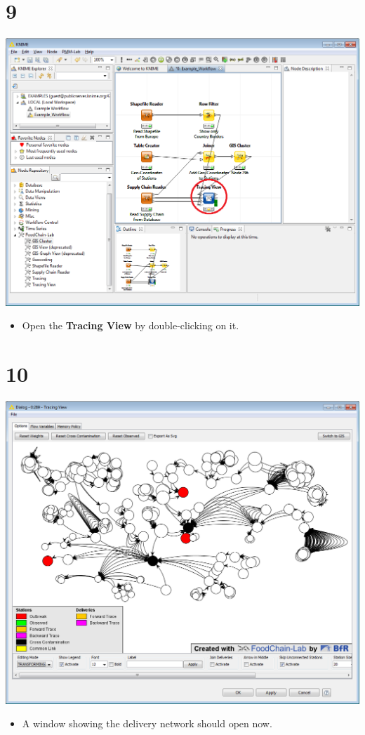 \documentclass{beamer}
\begin{document}
\section{9}
\begin{frame}
	\begin{center}
  		\includegraphics[height=0.6\textheight]{9.png}
	\end{center}
	\begin{itemize}
		\item Open the \textbf{Tracing View} by double-clicking on it.
	\end{itemize}
\end{frame}

\section{10}
\begin{frame}
	\begin{center}
  		\includegraphics[height=0.6\textheight]{10.png}
	\end{center}
	\begin{itemize}
		\item A window showing the delivery network should open now.
	\end{itemize}
\end{frame}
\end{document}
